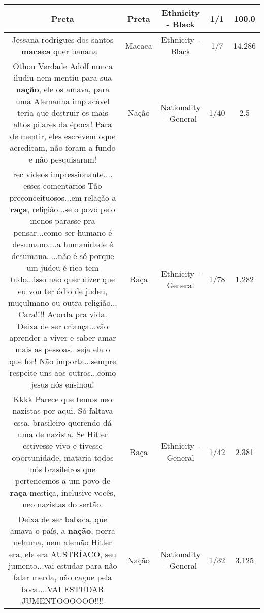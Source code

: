 \documentclass[11pt]{article}
\newlength\mylength
\begin{document}
\begin{center}
\begin{longtable}{|C{.65\mylength}|C{.30\mylength}|C{.12\mylength}|C{.12\mylength}|C{.12\mylength}|}
  \small Preta\normalsize   & Preta & Ethnicity - Black & 1/1 & 100.0 \\  \hline
  \small Jessana rodrigues dos santos \textbf{macaca} quer banana🍌🍌🍌\normalsize   & Macaca & Ethnicity - Black & 1/7 & 14.286 \\  \hline
  \small Othon Verdade Adolf nunca iludiu nem mentiu para sua \textbf{nação}, ele os amava, para uma Alemanha implacável teria que destruir os mais altos pilares da época! Para de mentir, eles escrevem oque acreditam, não foram a fundo e não pesquisaram!\normalsize   & Nação & Nationality - General & 1/40 & 2.5 \\  \hline
  \small rec videos impressionante.... esses comentarios Tão preconceituosos...em relação a \textbf{raça}, religião...se o povo pelo menos parasse pra pensar...como ser humano é desumano....a humanidade é desumana.....não é só porque um judeu é rico tem tudo...isso nao quer dizer que eu vou ter ódio de judeu, muçulmano ou outra religião... Cara!!!! Acorda pra vida. Deixa de ser criança...vão aprender a viver e saber amar mais as pessoas...seja ela o que for! Não importa...sempre respeite uns aos outros...como jesus nós ensinou!\normalsize   & Raça & Ethnicity - General & 1/78 & 1.282 \\  \hline
  \small Kkkk Parece que temos neo nazistas por aqui. Só faltava essa, brasileiro querendo dá uma de nazista. Se Hitler estivesse vivo e tivesse oportunidade, mataria todos nós brasileiros que pertencemos a um povo de \textbf{raça} mestiça, inclusive vocês, neo nazistas do sertão.\normalsize   & Raça & Ethnicity - General & 1/42 & 2.381 \\  \hline
  \small Deixa de ser babaca,  que amava o país,  a \textbf{nação},  porra nehuma, nem  alemão Hitler era,  ele era AUSTRÍACO,  seu jumento...vai estudar para não falar merda,  não cague pela boca....VAI ESTUDAR JUMENTOOOOOO!!!!\normalsize   & Nação & Nationality - General & 1/32 & 3.125 \\  \hline

\end{longtable}
\end{center}
\end{document}
